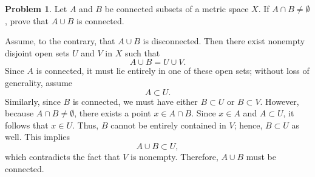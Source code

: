 \documentclass[12pt,oneside]{article}
\theoremstyle{definition}
\newtheorem{problem}{Problem}
\begin{document}
\bigskip

\newpage
\begin{problem}
Let \(A\) and \(B\) be connected subsets of a metric space \(X\). If \(A \cap B \neq \emptyset\), prove that \(A \cup B\) is connected.
\end{problem}

\newpage
\begin{solution}
Assume, to the contrary, that \(A \cup B\) is disconnected. Then there exist nonempty disjoint open sets \(U\) and \(V\) in \(X\) such that
\[
A \cup B = U \cup V.
\]
Since \(A\) is connected, it must lie entirely in one of these open sets; without loss of generality, assume
\[
A \subset U.
\]
Similarly, since \(B\) is connected, we must have either \(B \subset U\) or \(B \subset V\). However, because \(A \cap B \neq \emptyset\), there exists a point \(x \in A \cap B\). Since \(x \in A\) and \(A \subset U\), it follows that \(x \in U\). Thus, \(B\) cannot be entirely contained in \(V\); hence, \(B \subset U\) as well. This implies
\[
A \cup B \subset U,
\]
which contradicts the fact that \(V\) is nonempty. Therefore, \(A \cup B\) must be connected.
\end{solution}
\end{document}
